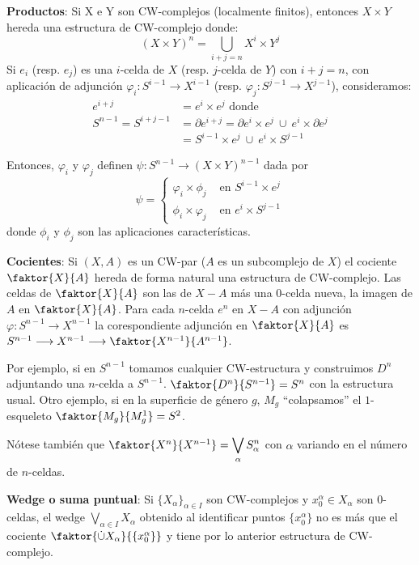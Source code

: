 \textbf{Productos}:  Si X e Y son CW-complejos (localmente finitos), entonces $X \times Y$ hereda una estructura de CW-complejo donde:
\[ (X \times Y)^n = \bigcup_{i+j=n} X^i \times Y^j \]
Si $e_i$ (resp. $e_j$) es una $i$-celda de $X$ (resp. $j$-celda de $Y$) con $i+j=n$, con aplicación de adjunción $\varphi_i : S^{i-1} \longrightarrow X^{i-1}$ (resp. $\varphi_j : S^{j-1} \longrightarrow X^{j-1}$), consideramos:
\begin{align*} 
e^{i+j} &= e^i \times e^j \text{ donde } \\
S^{n-1} = S^{i+j-1} &= \partial e^{i+j} = \partial e^i \times e^j \ \cup \ e^i \times \partial e^j \\
&= S^{i-1} \times e^j \ \cup \ e^i \times S^{j-1}
\end{align*}

Entonces, $\varphi_i$ y $\varphi_j$ definen $\psi : S^{n-1} \longrightarrow (X \times Y)^{n-1}$ dada por 
\[ \psi = \begin{cases}
\varphi_i  \times \phi_j & \text{ en } S^{i-1} \times e^j \\
\phi_i \times \varphi_j & \text{ en } e^i \times S^{j-1}
\end{cases} \]
donde $\phi_i$ y $\phi_j$ son las aplicaciones características. \par 

\textbf{Cocientes}: Si $(X, A)$ es un CW-par ($A$ es un subcomplejo de $X$) el cociente $\faktor{X}{A}$ hereda de forma natural una estructura de CW-complejo. Las celdas de $\faktor{X}{A}$ son las de $X - A$ más una $0$-celda nueva, la imagen de $A$ en $\faktor{X}{A}$. Para cada $n$-celda $e^n$ en $X - A$ con adjunción $\varphi : S^{n-1} \longrightarrow X^{n-1}$ la corespondiente adjunción en $\faktor{X}{A}$ es $S^{n-1} \longrightarrow X^{n-1} \longrightarrow \faktor{X^{n-1}}{A^{n-1}}$. \par
Por ejemplo, si en $S^{n-1}$ tomamos cualquier CW-estructura y construimos $D^n$ adjuntando una $n$-celda a $S^{n-1}$. $\faktor{D^n}{S^{n-1}} = S^n$ con la estructura usual. Otro ejemplo, si en la superficie de género $g$, $M_g$ ``colapsamos'' el $1$-esqueleto $\faktor{M_g}{M_g^1} = S^2$. \par 
Nótese también que $\faktor{X^n}{X^{n-1}} = \displaystyle \bigvee_\alpha S_\alpha^n$ con $\alpha$ variando en el número de $n$-celdas. \par 

\textbf{Wedge o suma puntual}: Si $\{X_\alpha \}_{\alpha \in I}$ son CW-complejos y $x_0^\alpha \in X_\alpha$  son $0$-celdas, el wedge $\bigvee_{\alpha \in I} X_\alpha$ obtenido al identificar puntos $\{x_0^\alpha \}$ no es más que el cociente $\faktor{\dot{\cup} X_\alpha}{\{x_0^\alpha\}}$ y tiene por lo anterior estructura de CW-complejo. \par

